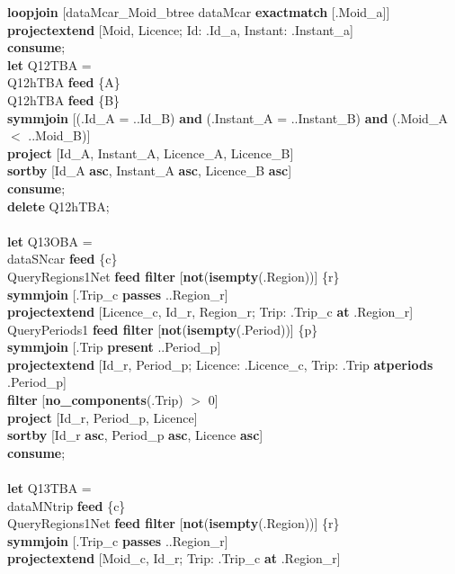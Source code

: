 \documentclass[a4paper]{article}
\newcommand{\op}[1]{\textbf{#1}}
\begin{document}
\begin{scriptsize}
\begin{tabbing}
\>\op{loopjoin} [dataMcar\_Moid\_btree dataMcar \op{exactmatch} [.Moid\_a]]\\
\>\op{projectextend} [Moid, Licence; Id: .Id\_a, Instant: .Instant\_a]\\
\op{consume};\\
\op{let} Q12TBA =\\
\>Q12hTBA \op{feed} \{A\}\\
\>Q12hTBA \op{feed} \{B\}\\
\>\op{symmjoin} [(.Id\_A = ..Id\_B) \op{and} (.Instant\_A = ..Instant\_B) \op{and} (.Moid\_A $<$ ..Moid\_B)]\\
\>\op{project} [Id\_A, Instant\_A, Licence\_A, Licence\_B]\\
\>\op{sortby} [Id\_A \op{asc}, Instant\_A \op{asc}, Licence\_B \op{asc}]\\
\op{consume};\\
\op{delete} Q12hTBA;\\
\\
\op{let} Q13OBA =\\
\>dataSNcar \op{feed} \{c\}\\
\>QueryRegions1Net \op{feed filter} [\op{not}(\op{isempty}(.Region))] \{r\}\\
\>\op{symmjoin} [.Trip\_c \op{passes} ..Region\_r]\\
\>\>\op{projectextend} [Licence\_c, Id\_r, Region\_r; Trip: .Trip\_c \op{at} .Region\_r]\\
\>QueryPeriods1 \op{feed filter} [\op{not}(\op{isempty}(.Period))] \{p\}\\
\>\op{symmjoin} [.Trip \op{present} ..Period\_p]\\
\>\op{projectextend} [Id\_r, Period\_p; Licence: .Licence\_c, Trip: .Trip \op{atperiods} .Period\_p]\\
\>\op{filter} [\op{no\_components}(.Trip) $>$ 0]\\
\>\op{project} [Id\_r, Period\_p, Licence]\\
\>\op{sortby} [Id\_r \op{asc}, Period\_p \op{asc}, Licence \op{asc}]\\
\op{consume};\\
\\
\op{let} Q13TBA =\\
\>dataMNtrip \op{feed} \{c\}\\
\>QueryRegions1Net \op{feed filter} [\op{not}(\op{isempty}(.Region))] \{r\}\\
\>\op{symmjoin} [.Trip\_c \op{passes} ..Region\_r]\\
\>\>\op{projectextend} [Moid\_c, Id\_r; Trip: .Trip\_c \op{at} .Region\_r]\\

\end{tabbing}
\end{scriptsize}
\end{document}

